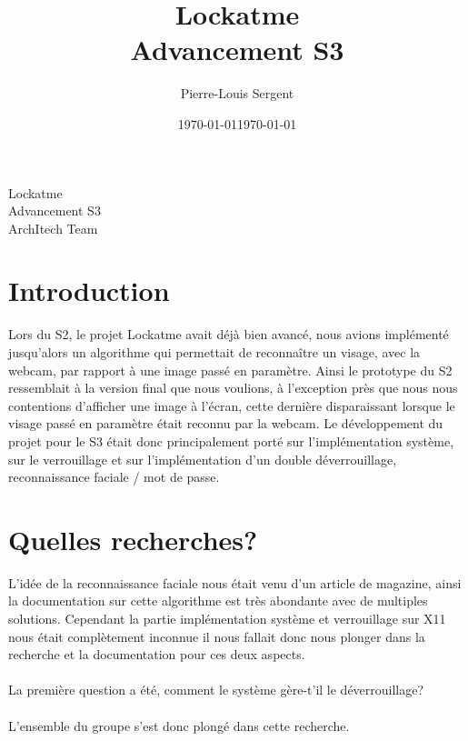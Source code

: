 \documentclass{article}
\title{Lockatme\\Advancement S3} \author{Pierre-Louis Sergent} \date{\today}
\begin{document}
\begin{titlepage}
  \vspace*{\fill} \begin{center}
  \Huge{Lockatme\\Advancement S3}\\[2.5cm]
  \normalsize{ArchItech Team}\\[3cm]
  \date{\today}
\end{center}
\vspace*{\fill}
\end{titlepage}

  \newpage

  \tableofcontents

  \newpage

  \section{Introduction}

  Lors du S2, le projet Lockatme avait déjà bien avancé, nous avions implémenté
  jusqu’alors un algorithme qui permettait de reconnaître un visage, avec la
  webcam, par rapport à une image passé en paramètre. Ainsi le prototype du S2
  ressemblait à la version final que nous voulions, à l’exception près que nous
  nous contentions d’afficher une image à l’écran, cette dernière disparaissant
  lorsque le visage passé en paramètre était reconnu par la webcam. Le
  développement du projet pour le S3 était donc principalement porté sur
  l’implémentation système, sur le verrouillage et sur l’implémentation d’un
  double déverrouillage, reconnaissance faciale / mot de passe.

  \section{Quelles recherches?}

  L’idée de la reconnaissance faciale nous était venu d’un article de magazine,
  ainsi la documentation sur cette algorithme est très abondante avec de
  multiples solutions. Cependant la partie implémentation système et
  verrouillage sur X11 nous était complètement inconnue il nous fallait donc
  nous plonger dans la recherche et la documentation pour ces deux aspects.
\\ \\
  La première question a été, comment le système gère-t’il le déverrouillage?
\\ \\
  L’ensemble du groupe s’est donc plongé dans cette recherche.
\end{document}

